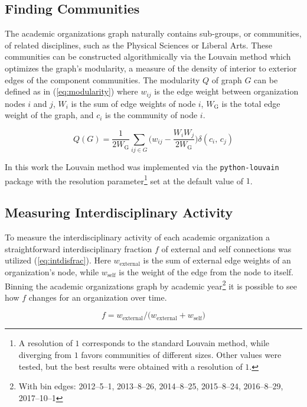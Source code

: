 \documentclass[notitlepage,aps,prd,nofootinbib]{revtex4-1}
\begin{document}
\subsection{Finding Communities}
The academic organizations graph naturally contains sub-groups, or communities, of related disciplines, such as the Physical Sciences or Liberal Arts. These communities can be constructed algorithmically via the Louvain method \cite{louvain} which optimizes the graph's modularity, a measure of the density of interior to exterior edges of the component communities. The modularity $Q$ of graph $G$ can be defined as in (\ref{eq:modularity}) where $w_{ij}$ is the edge weight between organization nodes $i$ and $j$, $W_{i}$ is the sum of edge weights of node $i$, $W_{\mathrm{G}}$ is the total edge weight of the graph, and $c_{i}$ is the community of node $i$.

\begin{equation} \label{eq:modularity}
Q\left(G\right) = \frac{1}{2 W_{\mathrm{G}}} \sum_{ij \in G} \bigg(w_{ij} - \frac{W_{i} W_{j}}{2 W_{\mathrm{G}}}\bigg) \delta\left(c_{i},\,c_{j}\right)
\end{equation}

In this work the Louvain method was implemented via the \texttt{python-louvain} package \cite{python-louvain} with the resolution parameter\footnote{A resolution of $1$ corresponds to the standard Louvain method, while diverging from $1$ favors communities of different sizes. Other values were tested, but the best results were obtained with a resolution of $1$.} set at the default value of $1$.


\subsection{Measuring Interdisciplinary Activity}
To measure the interdisciplinary activity of each academic organization a straightforward interdisciplinary fraction $f$ of external and self connections was utilized (\ref{eq:intdisfrac}). Here $w_{\text{external}}$ is the sum of external edge weights of an organization's node, while $w_{\text{self}}$ is the weight of the edge from the node to itself. Binning the academic organizations graph by academic year\footnote{With bin edges: 2012--5--1, 2013--8--26, 2014--8--25, 2015--8--24, 2016--8--29, 2017--10--1} it is possible to see how $f$ changes for an organization over time.

\begin{equation} \label{eq:intdisfrac}
f = w_{\text{external}} / \big(w_{\text{external}} + w_{\text{self}}\big)
\end{equation}
\end{document}
